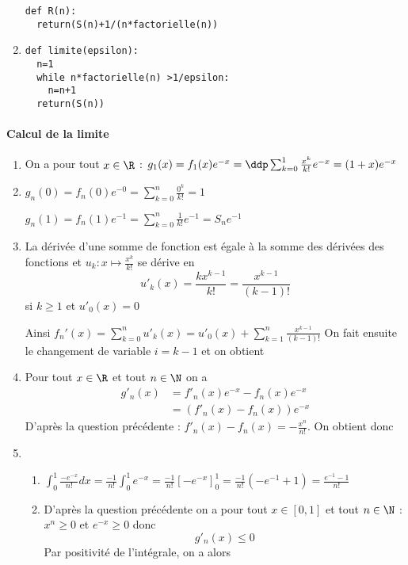 \documentclass[a4paper, 11pt,reqno]{article}
\begin{document}
\begin{correction}
\begin{enumerate}
\begin{lstlisting}
def R(n):
  return(S(n)+1/(n*factorielle(n))

\end{lstlisting}
\item \begin{lstlisting}
def limite(epsilon):
  n=1
  while n*factorielle(n) >1/epsilon:
    n=n+1
  return(S(n)) 
\end{lstlisting}
\end{enumerate}

\paragraph{Calcul de la limite}
\begin{enumerate}
\item On a pour tout $x\in \R$ : $g_1(x) =f_1(x)e^{-x} = \ddp \sum_{k=0}^1 \frac{x^k}{k!} e^{-x}= (1+x)e^{-x}$
\item $g_n(0)= f_n(0)e^{-0}=\sum_{k=0}^n \frac{0^k}{k!}=1 $

$g_n(1) = f_n(1)e^{-1}= \sum_{k=0}^n \frac{1}{k!}e^{-1}=S_ne^{-1}$

\item La dérivée d'une somme de fonction est égale à la somme des dérivées des fonctions et $u_k:x\mapsto \frac{x^k}{k!}$ se dérive en 
$$u'_k(x) = \frac{kx^{k-1}}{k!} = \frac{x^{k-1}}{(k-1)!}$$
si $k\geq 1$ et $u'_0(x)=0$

Ainsi $f_n'(x) = \sum_{k=0}^n u'_k(x)=  u'_0(x)+\sum_{k=1}^n \frac{x^{k-1}}{(k-1)!}$
On fait ensuite le changement de variable $i=k-1$ et  on obtient 

\item Pour tout $x\in \R$ et tout $n\in \N$ on a 
\begin{align*}
g'_n(x) &= f'_n(x)e^{-x} -f_n(x)e^{-x}\\
			&= (f'_n(x)-f_n(x))e^{-x}
\end{align*}
D'après la question précédente : $f'_n(x)-f_n(x)= -\frac{x^{n}}{n!}$. On obtient donc 


\item 
\begin{enumerate}
\item  $\int_0^1 \frac{-e^{-x}}{n!}dx= \frac{-1}{n!} \int_0^1 e^{-x}= \frac{-1}{n!} [-e^{-x}]_0^1 = \frac{-1}{n!} (-e^{-1}+1)= \frac{e^{-1}-1}{n!}$
\item 
D'après la question précédente on a pour tout $x\in [0,1]$ et tout $n\in \N $ : $x^n\geq 0$ et $e^{-x}\geq 0$ donc 
$$g'_n(x) \leq 0$$
Par positivité de l'intégrale, on a alors 


\end{enumerate}
\end{enumerate}
\end{correction}
\end{document}

